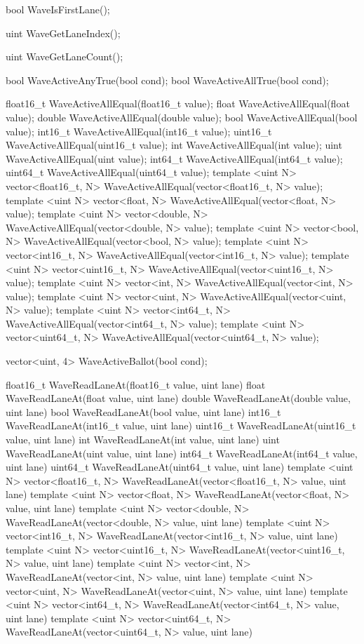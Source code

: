 \begin{HLSL}
bool WaveIsFirstLane();

uint WaveGetLaneIndex();

uint WaveGetLaneCount();

bool WaveActiveAnyTrue(bool cond);
bool WaveActiveAllTrue(bool cond);

float16_t WaveActiveAllEqual(float16_t value);
float WaveActiveAllEqual(float value);
double WaveActiveAllEqual(double value);
bool WaveActiveAllEqual(bool value);
int16_t WaveActiveAllEqual(int16_t value);
uint16_t WaveActiveAllEqual(uint16_t value);
int WaveActiveAllEqual(int value);
uint WaveActiveAllEqual(uint value);
int64_t WaveActiveAllEqual(int64_t value);
uint64_t WaveActiveAllEqual(uint64_t value);
template <uint N> vector<float16_t, N> WaveActiveAllEqual(vector<float16_t, N> value);
template <uint N> vector<float, N> WaveActiveAllEqual(vector<float, N> value);
template <uint N> vector<double, N> WaveActiveAllEqual(vector<double, N> value);
template <uint N> vector<bool, N> WaveActiveAllEqual(vector<bool, N> value);
template <uint N> vector<int16_t, N> WaveActiveAllEqual(vector<int16_t, N> value);
template <uint N> vector<uint16_t, N> WaveActiveAllEqual(vector<uint16_t, N> value);
template <uint N> vector<int, N> WaveActiveAllEqual(vector<int, N> value);
template <uint N> vector<uint, N> WaveActiveAllEqual(vector<uint, N> value);
template <uint N> vector<int64_t, N> WaveActiveAllEqual(vector<int64_t, N> value);
template <uint N> vector<uint64_t, N> WaveActiveAllEqual(vector<uint64_t, N> value);

vector<uint, 4> WaveActiveBallot(bool cond);


float16_t WaveReadLaneAt(float16_t value, uint lane)
float WaveReadLaneAt(float value, uint lane)
double WaveReadLaneAt(double value, uint lane)
bool WaveReadLaneAt(bool value, uint lane)
int16_t WaveReadLaneAt(int16_t value, uint lane)
uint16_t WaveReadLaneAt(uint16_t value, uint lane)
int WaveReadLaneAt(int value, uint lane)
uint WaveReadLaneAt(uint value, uint lane)
int64_t WaveReadLaneAt(int64_t value, uint lane)
uint64_t WaveReadLaneAt(uint64_t value, uint lane)
template <uint N> vector<float16_t, N> WaveReadLaneAt(vector<float16_t, N> value, uint lane)
template <uint N> vector<float, N> WaveReadLaneAt(vector<float, N> value, uint lane)
template <uint N> vector<double, N> WaveReadLaneAt(vector<double, N> value, uint lane)
template <uint N> vector<int16_t, N> WaveReadLaneAt(vector<int16_t, N> value, uint lane)
template <uint N> vector<uint16_t, N> WaveReadLaneAt(vector<uint16_t, N> value, uint lane)
template <uint N> vector<int, N> WaveReadLaneAt(vector<int, N> value, uint lane)
template <uint N> vector<uint, N> WaveReadLaneAt(vector<uint, N> value, uint lane)
template <uint N> vector<int64_t, N> WaveReadLaneAt(vector<int64_t, N> value, uint lane)
template <uint N> vector<uint64_t, N> WaveReadLaneAt(vector<uint64_t, N> value, uint lane)


\end{HLSL}
